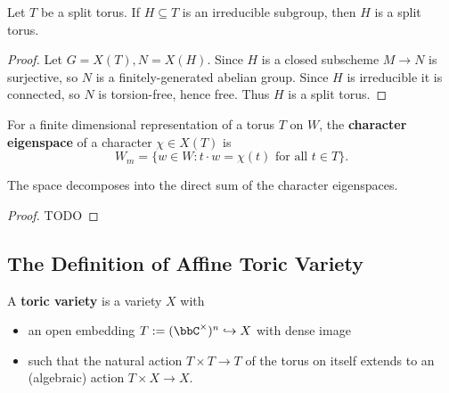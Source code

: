 \begin{proposition}
  \label{1-1-1-subgroup-subtorus}

  Let $T$ be a split torus.
  If $H \subseteq T$ is an irreducible subgroup, then $H$ is a split torus.
\end{proposition}
\begin{proof}

  Let $G = X(T), N=X(H)$. Since $H$ is a closed subscheme $M \to N$ is surjective,
  so $N$ is a finitely-generated abelian group. Since $H$ is irreducible it is connected,
  so $N$ is torsion-free, hence free. Thus $H$ is a split torus.
\end{proof}


\begin{definition}
  \label{1-1-char-eigenspace}

  For a finite dimensional representation of a torus $T$ on $W$, the {\bf character eigenspace} of a character $\chi \in X(T)$ is
  \[
    W_m = \{w\in W : t\cdot w = \chi(t)\text{ for all } t\in T \}.
  \]
\end{definition}


\begin{proposition}
  \label{1-1-2-char-eigenspace-direct-sum}

  The space decomposes into the direct sum of the character eigenspaces.
\end{proposition}
\begin{proof}
  \uses{}

  TODO
\end{proof}


\subsection{The Definition of Affine Toric Variety}


\begin{definition}
  \label{1-1-3-tor-var}
  \leanok

  A {\bf toric variety} is a variety $X$ with
  \begin{itemize}
    \item an open embedding $T := (\bbC^\times)^n \hookrightarrow X$ with dense image
    \item such that the natural action $T \times T \to T$ of the torus on itself extends to an (algebraic) action $T \times X \to X$.
  \end{itemize}
\end{definition}


